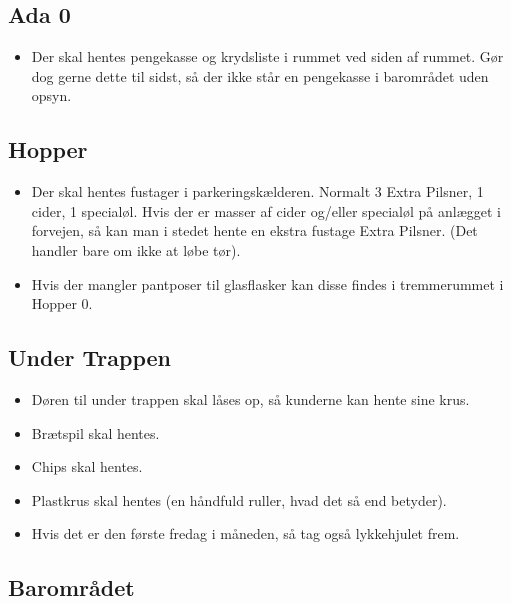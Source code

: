 \subsection{Ada 0}
\label{sec:pre:ada}

\begin{itemize}
\item Der skal hentes pengekasse og krydsliste i rummet ved siden af
  rummet. Gør dog gerne dette til sidst, så der ikke står en
  pengekasse i barområdet uden opsyn.
\end{itemize}

\subsection{Hopper}
\label{sec:pre:hopper}

\begin{itemize}
\item Der skal hentes fustager i parkeringskælderen. Normalt 3
  Extra Pilsner, 1 cider, 1 specialøl. Hvis der er masser af cider
  og/eller specialøl på anlægget i forvejen, så kan man i stedet hente
  en ekstra fustage Extra Pilsner. (Det handler bare om ikke at løbe
  tør).
\item Hvis der mangler pantposer til glasflasker kan disse findes i tremmerummet i Hopper 0.
\end{itemize}

\subsection{Under Trappen}
\label{sec:pre:under-trappen}

\begin{itemize}
\item Døren til under trappen skal låses op, så kunderne kan hente sine krus.
\item Brætspil skal hentes.
\item Chips skal hentes.
\item Plastkrus skal hentes (en håndfuld ruller, hvad det så end betyder).
\item Hvis det er den første fredag i måneden, så tag også lykkehjulet frem.
\end{itemize}

\subsection{Barområdet}
\label{sec:pre:baromradet}

